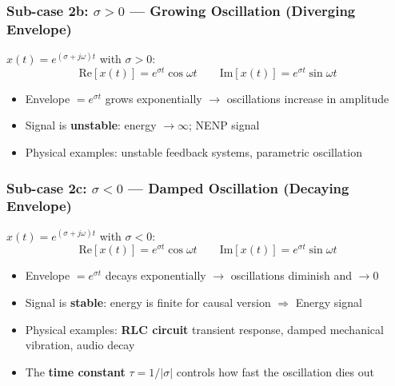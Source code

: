 \documentclass[10pt,a4paper]{article}
\begin{document}
\subsubsection*{Sub-case 2b: $\sigma > 0$ --- Growing Oscillation (Diverging Envelope)}

\begin{propbox}
$x(t) = e^{(\sigma+j\omega)t}$ with $\sigma > 0$:
\[
\text{Re}[x(t)] = e^{\sigma t}\cos\omega t \qquad \text{Im}[x(t)] = e^{\sigma t}\sin\omega t
\]
\begin{itemize}
  \item Envelope $= e^{\sigma t}$ grows exponentially $\to$ oscillations increase in amplitude
  \item Signal is \textbf{unstable}: energy $\to \infty$; NENP signal
  \item Physical examples: unstable feedback systems, parametric oscillation
\end{itemize}
\end{propbox}

\begin{center}
\end{center}

\subsubsection*{Sub-case 2c: $\sigma < 0$ --- Damped Oscillation (Decaying Envelope)}

\begin{propbox}
$x(t) = e^{(\sigma+j\omega)t}$ with $\sigma < 0$:
\[
\text{Re}[x(t)] = e^{\sigma t}\cos\omega t \qquad \text{Im}[x(t)] = e^{\sigma t}\sin\omega t
\]
\begin{itemize}
  \item Envelope $= e^{\sigma t}$ decays exponentially $\to$ oscillations diminish and $\to 0$
  \item Signal is \textbf{stable}: energy is finite for causal version $\Rightarrow$ Energy signal
  \item Physical examples: \textbf{RLC circuit} transient response, damped mechanical vibration, audio decay
  \item The \textbf{time constant} $\tau = 1/|\sigma|$ controls how fast the oscillation dies out
\end{itemize}
\end{propbox}
\end{document}
